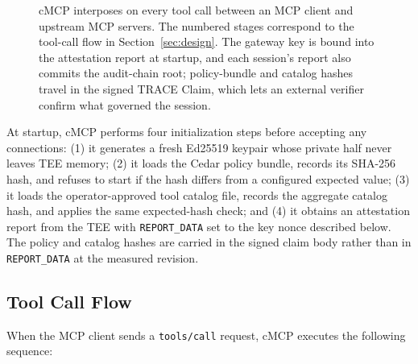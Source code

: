 \begin{figure}[h]
\caption{cMCP interposes on every tool call between an MCP client and upstream MCP
servers. The numbered stages correspond to the tool-call flow in
Section~\ref{sec:design}. The gateway key is bound into the attestation report at startup,
and each session's report also commits the audit-chain root; policy-bundle and catalog
hashes travel in the signed TRACE Claim, which lets an external verifier confirm what
governed the session.}
\label{fig:arch}
\end{figure}

At startup, cMCP performs four initialization steps before accepting any connections: (1) it
generates a fresh Ed25519 keypair whose private half never leaves TEE memory; (2) it loads
the Cedar policy bundle, records its SHA-256 hash, and refuses to start if the hash differs
from a configured expected value; (3) it loads the operator-approved tool catalog file,
records the aggregate catalog hash, and applies the same expected-hash check; and (4) it
obtains an attestation report from the TEE with \texttt{REPORT\_DATA} set to the key
nonce described below. The policy and catalog hashes are carried in
the signed claim body rather than in \texttt{REPORT\_DATA} at the measured revision.

\subsection{Tool Call Flow}

When the MCP client sends a \texttt{tools/call} request, cMCP executes the following
sequence:

